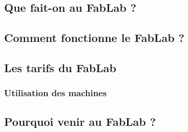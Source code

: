 \subsection{Que fait-on au FabLab ?}
\subsection{Comment fonctionne le FabLab ?}

\subsection{Les tarifs du FabLab}

\subsubsection{Utilisation des machines}

\subsection{Pourquoi venir au FabLab ?}
